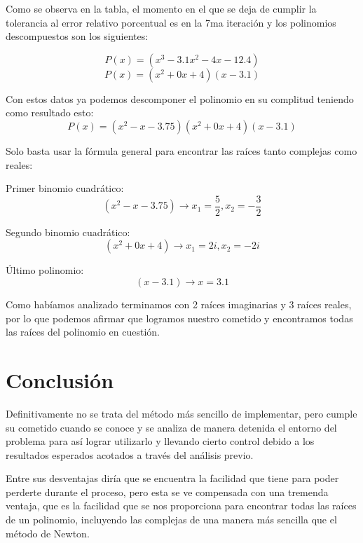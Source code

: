\documentclass{article}
\begin{document}
Como se observa en la tabla, el momento en el que se deja de cumplir la tolerancia al error
relativo porcentual es en la 7ma iteración y los polinomios descompuestos son los siguientes:


\begin{equation*}
   P(x) = (x^3-3.1x^2-4x-12.4)
\end{equation*}
\begin{equation*}
   P(x) = (x^2 +0x +4)(x-3.1)
\end{equation*}


Con estos datos ya podemos descomponer el polinomio en su complitud teniendo como resultado esto:
\begin{equation*}
   P(x) = (x^2 - x -3.75)(x^2 +0x +4)(x-3.1)
\end{equation*}


Solo basta usar la fórmula general para encontrar las raíces tanto complejas como reales:


Primer binomio cuadrático:
\begin{equation*}
   (x^2 - x -3.75) \rightarrow x_1 = \frac{5}{2}, x_2 = -\frac{3}{2}
\end{equation*}


Segundo binomio cuadrático:
\begin{equation*}
   (x^2 +0x +4) \rightarrow x_1 = 2i, x_2 = -2i
\end{equation*}


Último polinomio:
\begin{equation*}
   (x-3.1) \rightarrow x = 3.1
\end{equation*}


Como habíamos analizado terminamos con 2 raíces imaginarias y 3 raíces reales, por lo que
podemos afirmar que logramos nuestro cometido y encontramos todas las raíces del polinomio
en cuestión.


\newpage


\section{Conclusión}
Definitivamente no se trata del método más sencillo de implementar, pero cumple su cometido
cuando se conoce y se analiza de manera detenida el entorno del problema para así lograr
utilizarlo y llevando cierto control debido a los resultados esperados acotados a través
del análisis previo.


Entre sus desventajas diría que se encuentra la facilidad que tiene para poder perderte
durante el proceso, pero esta se ve compensada con una tremenda ventaja, que es la facilidad
que se nos proporciona para encontrar todas las raíces de un polinomio, incluyendo las complejas
de una manera más sencilla que el método de Newton.
\end{document}
